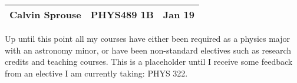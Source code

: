 \documentclass[a4paper, 12pt]{config/homework}
\begin{document}
\noindent
\begin{tabularx}{\textwidth}{>{\centering\arraybackslash}X>{\centering\arraybackslash}X>{\centering\arraybackslash}X}
Calvin Sprouse & PHYS489 1B & 2024 Jan 19\\
\midrule
\end{tabularx}

Up until this point all my courses have either been required as a physics major with an astronomy minor, or have been non-standard electives such as research credits and teaching courses. This is a placeholder until I receive some feedback from an elective I am currently taking: PHYS 322.
\end{document}
